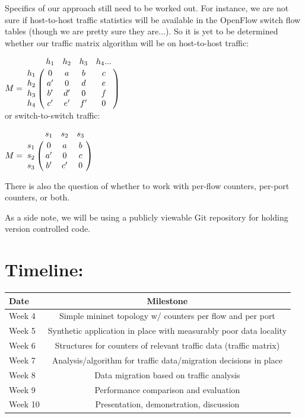 \documentclass[12pt]{article}
\begin{document}
Specifics of our approach still need to be worked out.  For instance, we are not sure if host-to-host
traffic statistics will be available in the OpenFlow switch flow tables (though we are pretty sure they
are...).  So it is yet to be determined whether our traffic matrix algorithm will be on host-to-host
traffic:

$
M = \bordermatrix{~ & h_1 & h_2 & h_3 & h_4 ... \cr
                  h_1 & 0 & a & b & c\cr
                  h_2 & a' & 0 & d & e\cr
                  h_3 & b' & d' & 0 & f\cr
                  h_4 & c' & e' & f' & 0\cr}
\vspace{5mm}
$
\\
\vspace{3mm}
\noindent or switch-to-switch traffic:

$
M = \bordermatrix{~ & s_1 & s_2 & s_3 \cr
                  s_1 & 0  & a & b \cr
                  s_2 & a' & 0 & c \cr
                  s_3 & b' & c' & 0 \cr}
$
\\
\vspace{3mm}

There is also the question of whether to work with per-flow counters, per-port counters, or both.

As a side note, we will be using a publicly viewable Git repository for holding version controlled code.

\vspace{10mm}

\section*{Timeline:}
\label{timeline}
\begin{center}
  \begin{tabular}{ l || c }
    \hline
    Date & Milestone \\ \hline \hline
    Week 4  & Simple mininet topology w/ counters per flow and per port \\ \hline
    Week 5  & Synthetic application in place with measurably poor data locality \\ \hline
    Week 6  & Structures for counters of relevant traffic data (traffic matrix) \\ \hline
    Week 7  & Analysis/algorithm for traffic data/migration decisions in place \\ \hline
    Week 8  & Data migration based on traffic analysis \\ \hline
    Week 9  & Performance comparison and evaluation \\ \hline
    Week 10 & Presentation, demonstration, discussion \\ 
    \hline
  \end{tabular}
\end{center}
\end{document}
